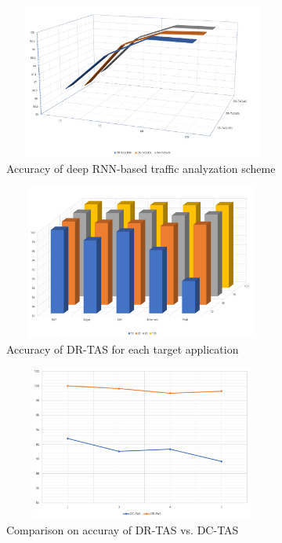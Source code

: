 \documentclass[10pt, twoside, jounal]{IEEEtran}
\begin{document}
\begin{figure}[!t]
\centering
\setlength{\abovecaptionskip}{0pt}
\setlength{\belowcaptionskip}{0pt}
{
\includegraphics[width=3.6in, height=2.0in]{fig3.jpg}
\caption{Accuracy of deep RNN-based traffic analyzation scheme}
\label{fig3}
}
\end{figure}
\begin{figure}[!t]
\centering
\setlength{\abovecaptionskip}{0pt}
\setlength{\belowcaptionskip}{0pt}
{
\includegraphics[width=3.6in, height=2.0in]{fig4.jpg}
\caption{Accuracy of DR-TAS for each target application}
\label{fig4}
}
\end{figure}

\begin{figure}[!t]
\centering
\setlength{\abovecaptionskip}{0pt}
\setlength{\belowcaptionskip}{0pt}
{
\includegraphics[width=3.6in, height=2.0in]{fig5.jpg}
\caption{Comparison on accuray of DR-TAS vs. DC-TAS }
\label{fig5}
}
\end{figure}
\end{document}
